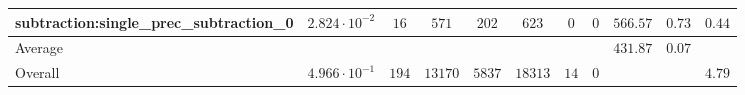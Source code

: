 \begin{tabular}{|l|c|c|c|c|c|c|c|c|c|c|}
subtraction:single\_prec\_subtraction\_0         & $ 2.824 \cdot 10^{-2} $ & $ 16     $ & $ 571   $ & $ 202  $ & $ 623   $ & $ 0  $ & $ 0 $ & $ 566.57      $ & $ 0.73    $ & $ 0.44    $ \\
\hline
Average                                          & $                     $ & $        $ & $       $ & $      $ & $       $ & $    $ & $   $ & $ 431.87      $ & $ 0.07    $ & $         $ \\
\hline
Overall                                          & $ 4.966 \cdot 10^{-1} $ & $ 194    $ & $ 13170 $ & $ 5837 $ & $ 18313 $ & $ 14 $ & $ 0 $ & $             $ & $         $ & $ 4.79    $ \\
\hline
\end{tabular}
